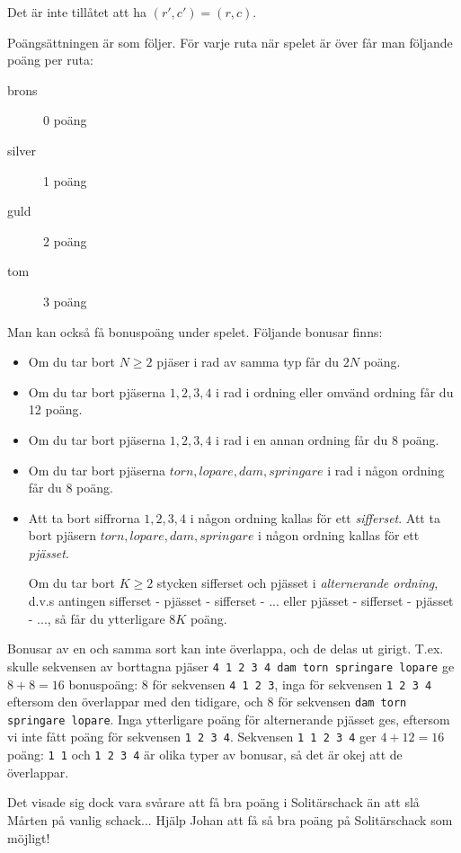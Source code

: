 Det är inte tillåtet att ha $(r', c') = (r, c)$.

Poängsättningen är som följer. För varje ruta när spelet är över får man följande poäng per ruta:
\begin{description}
  \item[brons] 0 poäng
  \item[silver] 1 poäng
  \item[guld] 2 poäng
  \item[tom] 3 poäng
\end{description}

Man kan också få bonuspoäng under spelet. Följande bonusar finns:
\begin{itemize}
  \item Om du tar bort $N \ge 2$ pjäser i rad av samma typ får du $2N$ poäng.
  \item Om du tar bort pjäserna $1, 2, 3, 4$ i rad i ordning eller omvänd ordning får du 12 poäng.
  \item Om du tar bort pjäserna $1, 2, 3, 4$ i rad i en annan ordning får du 8 poäng.
  \item Om du tar bort pjäserna $torn, lopare, dam, springare$ i rad i någon ordning får du 8 poäng.
  \item Att ta bort siffrorna $1, 2, 3, 4$ i någon ordning kallas för ett \emph{sifferset}.
    Att ta bort pjäsern $torn, lopare, dam, springare$ i någon ordning kallas för ett \emph{pjässet}.

    Om du tar bort $K \ge 2$ stycken sifferset och pjässet i \emph{alternerande ordning}, d.v.s antingen
    sifferset - pjässet - sifferset - ... eller pjässet - sifferset - pjässet - ..., så får du
    ytterligare $8K$ poäng.
\end{itemize}

Bonusar av en och samma sort kan inte överlappa, och de delas ut girigt.
T.ex. skulle sekvensen av borttagna pjäser \texttt{4 1 2 3 4 dam torn springare lopare} ge $8 + 8 = 16$ bonuspoäng:
8 för sekvensen \texttt{4 1 2 3},
inga för sekvensen \texttt{1 2 3 4} eftersom den överlappar med den tidigare,
och 8 för sekvensen \texttt{dam torn springare lopare}.
Inga ytterligare poäng för alternerande pjässet ges, eftersom vi inte fått poäng för sekvensen \texttt{1 2 3 4}.
Sekvensen \texttt{1 1 2 3 4} ger $4 + 12 = 16$ poäng: \texttt{1 1} och \texttt{1 2 3 4} är olika typer av bonusar, så det är okej att de överlappar.

Det visade sig dock vara svårare att få bra poäng i Solitärschack än att slå Mårten på vanlig schack... Hjälp Johan att få så
bra poäng på Solitärschack som möjligt!


